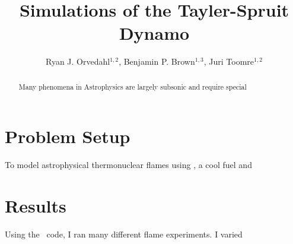 \documentclass[apj,twocolumn]{emulateapj}
\begin{document}
\title{Simulations of the Tayler-Spruit Dynamo}
\author{Ryan J. Orvedahl$^{1,2}$, Benjamin P. Brown$^{1,3}$, 
        Juri Toomre$^{1,2}$}


\begin{abstract}
Many phenomena in Astrophysics are largely subsonic and require special
\end{abstract}


\maketitle





\section{Problem Setup}
\label{sec:flame}
To model astrophysical thermonuclear flames using \maestro, a cool fuel and 


\section{Results}
\label{sec:results}
Using the \maestro\ code, I ran many different flame experiments. I varied 


\end{document}
